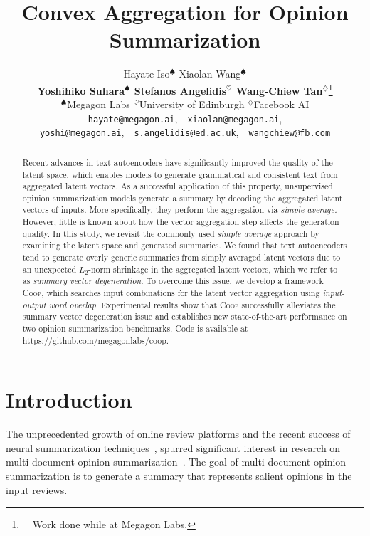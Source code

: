 \documentclass[11pt]{article}
\title{Convex Aggregation for Opinion Summarization}
\author{
Hayate Iso$^{\spadesuit}$ \quad
Xiaolan Wang$^{\spadesuit}$ \\
\textbf{Yoshihiko Suhara$^{\spadesuit}$ \quad
Stefanos Angelidis$^{\heartsuit}$ \quad
Wang-Chiew Tan$^{\diamondsuit}$}\thanks{~~Work done while at Megagon Labs.} \\
$^\spadesuit$Megagon Labs \quad
$^\heartsuit$University of Edinburgh \quad
$^\diamondsuit$Facebook AI\\
\texttt{hayate@megagon.ai},~~\texttt{xiaolan@megagon.ai},\\
\texttt{yoshi@megagon.ai},~~\texttt{s.angelidis@ed.ac.uk},~~\texttt{wangchiew@fb.com}}
\newcommand{\aggname}{\textsc{Coop}}
\newcommand{\hl}[1]{#1}
\begin{document}
\maketitle
\begin{abstract}
Recent advances in text autoencoders have significantly improved the quality of the latent space, which enables models to generate \hl{grammatical and consistent} text from aggregated latent vectors.
As a successful application of this property, unsupervised opinion summarization models generate a summary by decoding the aggregated latent vectors of inputs. More specifically, they perform the aggregation via {\em simple average.}
However, little is known about how the vector aggregation step affects the generation quality.
In this study, we revisit the commonly used {\em simple average} approach by examining the latent space and generated summaries. We found that text autoencoders tend to generate overly generic summaries from simply averaged latent vectors due to an unexpected $L_2$-norm shrinkage in the aggregated latent vectors, which we refer to as {\em summary vector degeneration}.
To overcome this issue, we develop a framework \aggname, which searches input combinations for the latent vector aggregation using {\em input-output word overlap}. Experimental results show that \aggname{} successfully alleviates the summary vector degeneration issue and establishes new state-of-the-art performance on two opinion summarization benchmarks.
Code is available at \url{https://github.com/megagonlabs/coop}.
\end{abstract}

\section{Introduction}
The unprecedented growth of online review platforms and the recent success of neural summarization techniques~\cite{cheng-lapata-2016-neural,see-etal-2017-get,liu-lapata-2019-hierarchical},
spurred significant interest in research on multi-document opinion summarization~\cite{angelidis-lapata-2018-summarizing,Chu:2019:MeanSum,brazinskas-etal-2020-unsupervised,suhara-etal-2020-opiniondigest,amplayo-lapata-2020-unsupervised,amplayo2021unsupervised}.
The goal of multi-document opinion summarization is
to generate a summary that represents salient opinions in the input reviews.
\end{document}
